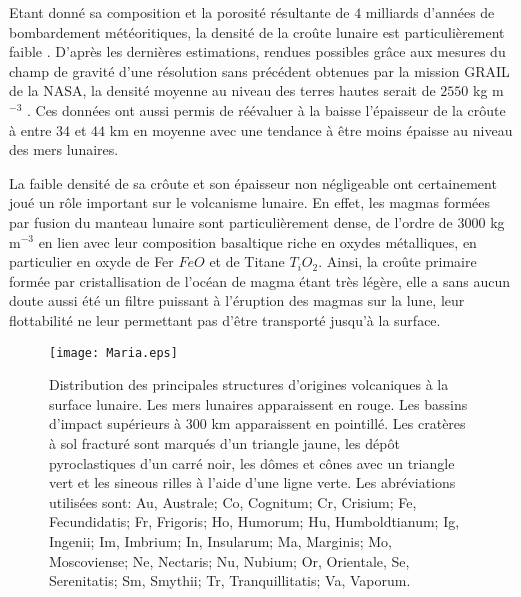 Etant donné sa composition et  la porosité résultante de $4$ milliards
d'années  de  bombardement  météoritiques,  la densité  de  la  croûte
lunaire  est particulièrement  faible \citep{Huang:2012gf,Han:2014ic}.
D'après les dernières estimations, rendues possibles grâce aux mesures
du champ  de gravité d'une  résolution sans précédent obtenues  par la
mission GRAIL  de la  NASA, la  densité moyenne  au niveau  des terres
hautes serait  de $2550$  kg m$^{-3}$  \citep{Wieczorek:2013ipa}.  Ces
données ont  aussi permis de réévaluer  à la baisse l'épaisseur  de la
crôute à  entre $34$ et  $44$ km en moyenne  avec une tendance  à être
moins épaisse au niveau des mers lunaires.

La faible  densité de sa crôute  et son épaisseur non  négligeable ont
certainement joué  un rôle  important sur  le volcanisme  lunaire.  En
effet,  les  magmas  formées  par   fusion  du  manteau  lunaire  sont
particulièrement   dense,   de   l'ordre   de   $3000$   kg   m$^{-3}$
\citep{Kiefer:2012kp} en  lien avec leur composition  basaltique riche
en oxydes  métalliques, en  particulier en  oxyde de  Fer $FeO$  et de
Titane $T_iO_2$. Ainsi, la  croûte primaire formée par cristallisation
de l'océan de  magma étant très légère, elle a  sans aucun doute aussi
été  un filtre  puissant à  l'éruption des  magmas sur  la lune,  leur
flottabilité  ne  leur permettant  pas  d'être  transporté jusqu'à  la
surface.

\begin{figure}[h!]
  \begin{center}
    \graphicspath{ {/Users/thorey/Documents/These/Manuscript/Figure/Chapter1/} }
    \texttt{[image: Maria.eps]}
    \caption{Distribution   des   principales  structures   d'origines
      volcaniques   à  la   surface   lunaire.    Les  mers   lunaires
      apparaissent en  rouge. Les bassins d'impact  supérieurs à $300$
      km apparaissent en pointillé.  Les  cratères à sol fracturé sont
      marqués d'un triangle jaune, les dépôt pyroclastiques d'un carré
      noir, les  dômes et cônes avec  un triangle vert et  les sineous
      rilles à  l'aide d'une  ligne verte. Les  abréviations utilisées
      sont: Au, Australe; Co, Cognitum; Cr, Crisium; Fe, Fecundidatis;
      Fr, Frigoris;  Ho, Humorum; Hu, Humboldtianum;  Ig, Ingenii; Im,
      Imbrium;  In,  Insularum;  Ma, Marginis;  Mo,  Moscoviense;  Ne,
      Nectaris;  Nu,  Nubium;  Or,  Orientale,  Se,  Serenitatis;  Sm,
      Smythii; Tr, Tranquillitatis; Va, Vaporum.}
    \label{C1-picture}
  \end{center}
\end{figure}

